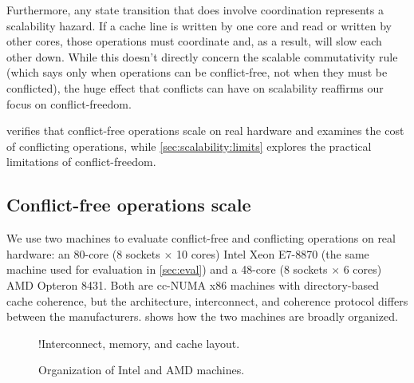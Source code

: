 Furthermore, any state transition that does involve coordination
represents a scalability hazard.  If a cache line is written by one
core and read or written by other cores, those operations must
coordinate and, as a result, will slow each other down.  While this
doesn't directly concern the scalable commutativity rule (which says
only when operations can be conflict-free, not when they must be
conflicted), the huge effect that conflicts can have on scalability
reaffirms our focus on conflict-freedom.

 verifies that conflict-free
operations scale on real hardware and examines the cost of conflicting
operations, while \cref{sec:scalability:limits} explores the practical
limitations of conflict-freedom.


\subsection{Conflict-free operations scale}
\label{sec:scalability:conflict-free}

We use two machines to evaluate conflict-free and conflicting
operations on real
hardware: an 80-core (8 sockets $\times$ 10 cores) Intel Xeon E7-8870
(the same machine used for evaluation in \cref{sec:eval}) and a
48-core (8 sockets $\times$ 6 cores) AMD Opteron 8431.  Both are
cc-NUMA x86 machines with directory-based cache coherence, but the
architecture, interconnect, and coherence protocol
differs between the manufacturers.   shows how the
two machines are broadly organized.

\begin{figure}
  \centering
  \XXX!{Interconnect, memory, and cache layout.}
  \caption{Organization of Intel and AMD machines.}
  \label{fig:machines}
\end{figure}



\begin{figure}
  \centering
  
  \label{fig:cfree-cycles}
\end{figure}


